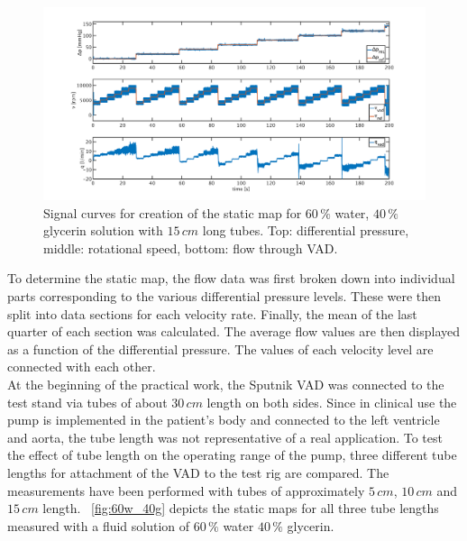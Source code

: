 \begin{figure}[ht]
  \flushleft
  \includegraphics[width=\textwidth]{images/plots_syst_ident/Test_60w40g_long.pdf}
  \caption[Signal curves for creation of the static map.]{Signal curves for creation of the static map for $60\,\%$ water, $40\,\%$ glycerin solution with $15 \, cm$ long tubes. Top: differential pressure, middle: rotational speed, bottom: flow through VAD.}
  \label{fig:test_60w40g_long}
\end{figure}
To determine the static map, the flow data was first broken down into individual parts corresponding to the various differential pressure levels.  These were then split into data sections for each velocity rate. Finally, the mean of the last quarter of each section was calculated. The average flow values are then displayed as a function of the differential pressure. The values of each velocity level are connected with each other.
\\At the beginning of the practical work, the Sputnik VAD was connected to the test stand via tubes of about $30\, cm$ length on both sides. Since in clinical use the pump is implemented in the patient's body and connected to the left ventricle and aorta, the tube length was not representative of a real application. To test the effect of tube length on the operating range of the pump, three different tube lengths for attachment of the VAD to the test rig are compared. The measurements have been performed with tubes of approximately $5\, cm$, $10\, cm$ and $15\, cm$ length. \figurename~\ref{fig:60w_40g} depicts the static maps for all three tube lengths measured with a fluid solution of $60\, \%$ water $40\, \%$ glycerin.
